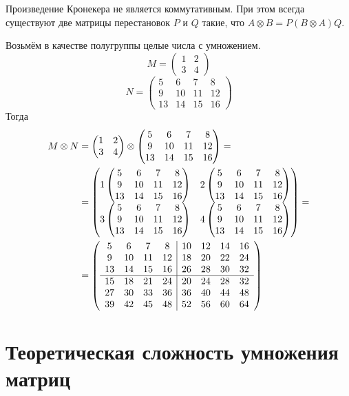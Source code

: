 \begin{assumption}\label{assumption:KronIsNotCommutative}
	Произведение Кронекера не является коммутативным.
	При этом всегда существуют две матрицы перестановок $P$ и $Q$ такие, что $A \otimes B = P(B \otimes A)Q$.
\end{assumption}

\newcommand{\examplemtrx}
{
	\begin{pmatrix}
		5  & 6  & 7  & 8  \\
		9  & 10 & 11 & 12 \\
		13 & 14 & 15 & 16
	\end{pmatrix}
}

\begin{example}
	Возьмём в качестве полугруппы целые числа с умножением.
	$$M=
		\begin{pmatrix}
			1 & 2 \\
			3 & 4
		\end{pmatrix}
	$$
	$$N=\examplemtrx
	$$
	Тогда
	\begin{align}
		M \otimes N & =
		\begin{pmatrix}
			1 & 2 \\
			3 & 4
		\end{pmatrix}
		\otimes
		\examplemtrx = \notag \\ &=
		\begin{pmatrix}
			1\examplemtrx & 2\examplemtrx \\
			3\examplemtrx & 4\examplemtrx
		\end{pmatrix}
		=\notag               \\
		            & =
		\left(\begin{array}{c c c c | c c c c}
			      5  & 6  & 7  & 8  & 10 & 12 & 14 & 16 \\
			      9  & 10 & 11 & 12 & 18 & 20 & 22 & 24 \\
			      13 & 14 & 15 & 16 & 26 & 28 & 30 & 32 \\
			      \hline
			      15 & 18 & 21 & 24 & 20 & 24 & 28 & 32 \\
			      27 & 30 & 33 & 36 & 36 & 40 & 44 & 48 \\
			      39 & 42 & 45 & 48 & 52 & 56 & 60 & 64
		      \end{array}\right)
	\end{align}
\end{example}


\section{Теоретическая сложность умножения матриц}

